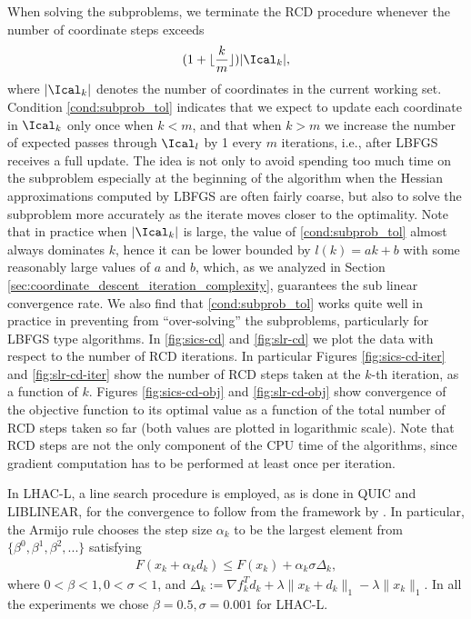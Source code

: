 \documentclass[11pt]{article}
\numberwithin{equation}{section}
\begin{document}
When solving the subproblems, we terminate the RCD procedure whenever the number of coordinate steps exceeds
\begin{align}        
\label{cond:subprob_tol}
     (1 + \lfloor \frac{k}{m} \rfloor ) |\Ical_k|,
 \end{align} 
where $|\Ical_k|$ denotes the number of coordinates in the current working set. Condition \eqref{cond:subprob_tol} indicates that we expect to update each coordinate in $\Ical_k$ only once when $k < m$, and that when $k > m$ we increase the number of expected passes through $\Ical_l$ by 1 every $m$ iterations, i.e., after LBFGS receives a full update. The idea is not only to avoid spending too much time on the subproblem especially at the beginning of the algorithm when the Hessian approximations computed by LBFGS are often fairly coarse, but also to solve the subproblem more accurately as the iterate moves closer to the optimality. Note that in practice when $|\Ical_k|$ is large, the value of  \eqref{cond:subprob_tol} almost always dominates $k$, hence it can be lower bounded by $l(k)=ak+b$ with some reasonably large values of $a$ and $b$, which, as we analyzed in Section \ref{sec:coordinate_descent_iteration_complexity},  guarantees the sub linear convergence rate. We also find that \eqref{cond:subprob_tol} works quite well in practice in preventing from ``over-solving'' the subproblems, particularly for LBFGS type algorithms. In \ref{fig:sics-cd} and \ref{fig:slr-cd} we plot the data with respect to the number of RCD iterations. In particular Figures \ref{fig:sics-cd-iter} and \ref{fig:slr-cd-iter} show the number of RCD steps taken at the $k$-th iteration, as a function of  $k$. Figures \ref{fig:sics-cd-obj} and \ref{fig:slr-cd-obj} show convergence of the objective function to its optimal value as a function of the total number of RCD steps taken so far (both values are plotted in logarithmic scale). Note that RCD steps are not the only component of the CPU time of the algorithms, since gradient computation has to be performed at least once per iteration. 

In LHAC-L,  a line search procedure is employed, as is done  in QUIC and LIBLINEAR,   for the convergence  to follow from the framework by \cite{Tseng2009}. In particular, the Armijo rule chooses the step size $\alpha_k$ to be the largest element from $\{\beta^0, \beta^1, \beta^2, ... \}$ satisfying
\begin{align}
    \label{equ:line_search}
    F(x_k + \alpha_k d_k) \leq F(x_k) + \alpha_k \sigma \Delta_k,
\end{align} 
where $0 < \beta < 1, 0 < \sigma < 1$, and $\Delta_k := \nabla f_k^T d_k + \lambda \|x_k + d_k\|_1 - \lambda \|x_k\|_1$. In all the experiments we chose $\beta = 0.5, \sigma = 0.001$ for LHAC-L.
\end{document}
